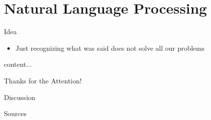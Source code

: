 \documentclass{beamer}
\begin{document}
	\section{Natural Language Processing}
	
	\begin{frame}{Idea}
		\begin{itemize}
			\item Just recognizing what was said does not solve all our problems
		\end{itemize}
	\end{frame}
	
	\begin{frame}{}
		content...
	\end{frame}
	
	\begin{frame}{}
		Thanks for the Attention!
	\end{frame}
	
	\begin{frame}{}
		Discussion
	\end{frame}
	
	
	\begin{frame}{Sources}
		
		
	\end{frame}
	
\end{document}
